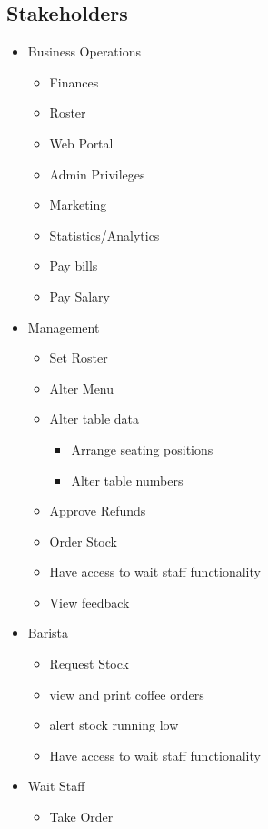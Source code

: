 \documentclass{article}
\begin{document}
\subsection{Stakeholders}
\begin{itemize}
    \item {Business Operations}
    \begin{itemize}
        \item {Finances}
        \item {Roster}
        \item {Web Portal}
        \item {Admin Privileges}
        \item {Marketing}
        \item {Statistics/Analytics}
        \item Pay bills
        \item Pay Salary
    \end{itemize}
    \item {Management}
    \begin{itemize}
        \item {Set Roster}
        \item {Alter Menu}
        \item {Alter table data}
        \begin{itemize}
            \item {Arrange seating positions}
            \item {Alter table numbers}
        \end{itemize}
        \item {Approve Refunds}
        \item {Order Stock}
        \item {Have access to wait staff functionality}
        \item View feedback
    \end{itemize}
    \item {Barista}
    \begin{itemize}
        \item {Request Stock}
        \item view and print coffee orders
        \item alert stock running low
        \item {Have access to wait staff functionality}
    \end{itemize}
    \item {Wait Staff}
    \begin{itemize}
        \item {Take Order}

\end{itemize}
\end{itemize}
\end{document}
